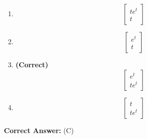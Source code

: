 \documentclass[11pt,a4paper]{article}
\begin{document}
\begin{enumerate}[label=(\Alph*)]
    \item \[
\begin{bmatrix} te^{t}\\t \end{bmatrix}
\]
    \item \[
\begin{bmatrix} e^{t}\\t \end{bmatrix}
\]
    \item \textbf{(Correct)} \[
\begin{bmatrix} e^{t}\\t e^{t} \end{bmatrix}
\]
    \item \[
\begin{bmatrix} t\\t e^{t} \end{bmatrix}
\]
\end{enumerate}

\noindent \textbf{Correct Answer:} (C)
\end{document}
